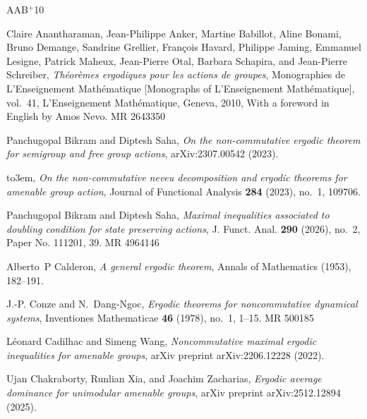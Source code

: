 \documentclass[11pt]{amsart}
\theoremstyle{definition}
\theoremstyle{myremark}
\numberwithin{equation}{section}
\begin{document}
\newcommand{\etalchar}[1]{$^{#1}$}
\providecommand{\bysame}{\leavevmode\hbox to3em{\hrulefill}\thinspace}
\providecommand{\MR}{\relax\ifhmode\unskip\space\fi MR }
\providecommand{\MRhref}[2]{%
	\href{http://www.ams.org/mathscinet-getitem?mr=#1}{#2}
}
\providecommand{\href}[2]{#2}
\begin{thebibliography}{AAB{\etalchar{+}}10}
	
	\bibitem[AAB{\etalchar{+}}10]{anantharaman2010ergodic}
	Claire Anantharaman, Jean-Philippe Anker, Martine Babillot, Aline Bonami, Bruno
	Demange, Sandrine Grellier, Fran\c{c}ois Havard, Philippe Jaming, Emmanuel
	Lesigne, Patrick Maheux, Jean-Pierre Otal, Barbara Schapira, and Jean-Pierre
	Schreiber, \emph{Th\'{e}or\`emes ergodiques pour les actions de groupes},
	Monographies de L'Enseignement Math\'{e}matique [Monographs of L'Enseignement
	Math\'{e}matique], vol.~41, L'Enseignement Math\'{e}matique, Geneva, 2010,
	With a foreword in English by Amos Nevo. \MR{2643350}
	
	Panchugopal Bikram and Diptesh Saha, \emph{On the non-commutative ergodic
		theorem for semigroup and free group actions}, arXiv:2307.00542 (2023).
	
	\bysame, \emph{On the non-commutative neveu decomposition and ergodic theorems
		for amenable group action}, Journal of Functional Analysis \textbf{284}
	(2023), no.~1, 109706.
	
	Panchugopal Bikram and Diptesh Saha, \emph{Maximal inequalities associated to
		doubling condition for state preserving actions}, J. Funct. Anal.
	\textbf{290} (2026), no.~2, Paper No. 111201, 39. \MR{4964146}
	
	Alberto~P Calderon, \emph{A general ergodic theorem}, Annals of Mathematics
	(1953), 182--191.
	
	J.-P. Conze and N.~Dang-Ngoc, \emph{Ergodic theorems for noncommutative
		dynamical systems}, Inventiones Mathematicae \textbf{46} (1978), no.~1,
	1--15. \MR{500185}
	
	L{\'e}onard Cadilhac and Simeng Wang, \emph{Noncommutative maximal ergodic
		inequalities for amenable groups}, arXiv preprint arXiv:2206.12228 (2022).
	
	Ujan Chakraborty, Runlian Xia, and Joachim Zacharias, \emph{Ergodic average
		dominance for unimodular amenable groups}, arXiv preprint arXiv:2512.12894
	(2025).
	

\end{thebibliography}
\end{document}
